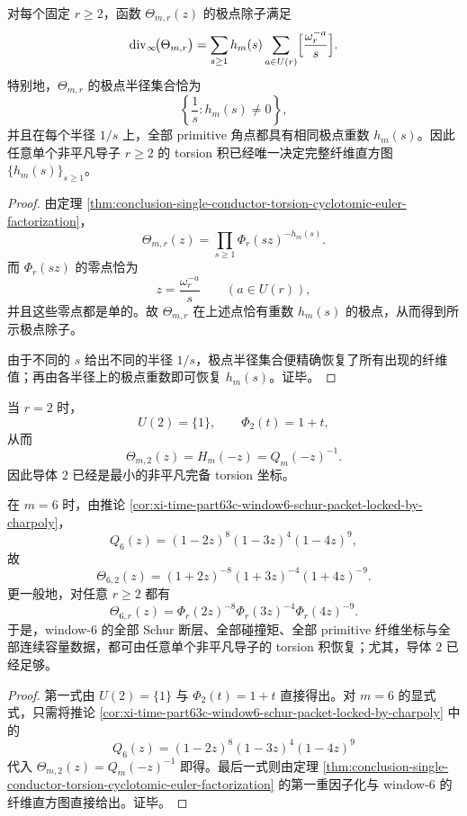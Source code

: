 \begin{theorem}[单导子极点除子对纤维直方图的刚性恢复]\label{thm:conclusion-single-conductor-torsion-pole-divisor-recovers-histogram}
对每个固定 \(r\ge 2\)，函数 \(\Theta_{m,r}(z)\) 的极点除子满足
\[
\operatorname{div}_{\infty}\!\bigl(\Theta_{m,r}\bigr)
=
\sum_{s\ge 1}h_m(s)\sum_{a\in U(r)}\Bigl[\frac{\omega_r^{-a}}{s}\Bigr].
\]
特别地，\(\Theta_{m,r}\) 的极点半径集合恰为
\[
\left\{\frac{1}{s}: h_m(s)\neq 0\right\},
\]
并且在每个半径 \(1/s\) 上，全部 primitive 角点都具有相同极点重数 \(h_m(s)\)。因此任意单个非平凡导子 \(r\ge 2\) 的 torsion 积已经唯一决定完整纤维直方图 \(\{h_m(s)\}_{s\ge 1}\)。
\end{theorem}

\begin{proof}
由定理 \ref{thm:conclusion-single-conductor-torsion-cyclotomic-euler-factorization}，
\[
\Theta_{m,r}(z)=\prod_{s\ge 1}\Phi_r(sz)^{-h_m(s)}.
\]
而 \(\Phi_r(sz)\) 的零点恰为
\[
z=\frac{\omega_r^{-a}}{s}
\qquad
(a\in U(r)),
\]
并且这些零点都是单的。故 \(\Theta_{m,r}\) 在上述点恰有重数 \(h_m(s)\) 的极点，从而得到所示极点除子。

由于不同的 \(s\) 给出不同的半径 \(1/s\)，极点半径集合便精确恢复了所有出现的纤维值；再由各半径上的极点重数即可恢复 \(h_m(s)\)。证毕。
\end{proof}

\begin{corollary}\label{cor:conclusion-single-conductor-r2-minimal-completeness-window6}
当 \(r=2\) 时，
\[
U(2)=\{1\},
\qquad
\Phi_2(t)=1+t,
\]
从而
\[
\Theta_{m,2}(z)=H_m(-z)=Q_m(-z)^{-1}.
\]
因此导体 \(2\) 已经是最小的非平凡完备 torsion 坐标。

在 \(m=6\) 时，由推论 \ref{cor:xi-time-part63c-window6-schur-packet-locked-by-charpoly}，
\[
Q_6(z)=(1-2z)^8(1-3z)^4(1-4z)^9,
\]
故
\[
\Theta_{6,2}(z)=(1+2z)^{-8}(1+3z)^{-4}(1+4z)^{-9}.
\]
更一般地，对任意 \(r\ge 2\) 都有
\[
\Theta_{6,r}(z)=\Phi_r(2z)^{-8}\Phi_r(3z)^{-4}\Phi_r(4z)^{-9}.
\]
于是，window-\(6\) 的全部 Schur 断层、全部碰撞矩、全部 primitive 纤维坐标与全部连续容量数据，都可由任意单个非平凡导子的 torsion 积恢复；尤其，导体 \(2\) 已经足够。
\end{corollary}

\begin{proof}
第一式由 \(U(2)=\{1\}\) 与 \(\Phi_2(t)=1+t\) 直接得出。对 \(m=6\) 的显式式，只需将推论 \ref{cor:xi-time-part63c-window6-schur-packet-locked-by-charpoly} 中的
\[
Q_6(z)=(1-2z)^8(1-3z)^4(1-4z)^9
\]
代入 \(\Theta_{m,2}(z)=Q_m(-z)^{-1}\) 即得。最后一式则由定理 \ref{thm:conclusion-single-conductor-torsion-cyclotomic-euler-factorization} 的第一重因子化与 window-\(6\) 的纤维直方图直接给出。证毕。
\end{proof}

